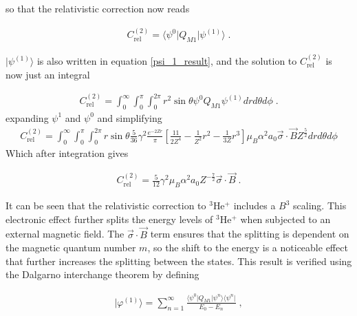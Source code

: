             \noindent so that the relativistic correction now reads 

            \begin{align}
                C_{\text{rel}}^{(2)} = \langle \psi^0 \vert Q_{M1} \vert \psi^{(1)} \rangle\;.
            \end{align}

            \noindent $\vert \psi^{(1)} \rangle$ is also written in equation \eqref{psi_1_result}, and the solution to $C_{\text{rel}}^{(2)}$ is now just an integral 

            \begin{align}
                C_{\text{rel}}^{(2)} = \int_0^\infty \int_0^\pi \int_0^{2\pi} r^2 \sin\theta \psi^0 Q_{M1} \psi^{(1)} dr d\theta d\phi\;.
            \end{align}
            \noindent expanding $\psi^1$ and $\psi^0$ and simplifying
            \small
            \begin{align}
                C_{\text{rel}}^{(2)} = \int_0^\infty \int_0^\pi \int_0^{2\pi} r \sin \theta \frac{5}{36} \gamma^2 \frac{e^{-2Zr}}{\pi} \left[ \frac{11}{2Z^4} - \frac{1}{Z^2}r^2 - \frac{1}{3Z} r^3 \right]  \mu_B \alpha^2 a_0 \vec{\sigma} \cdot \vec{B} Z^{\frac{5}{2}}  dr d\theta d\phi
            \end{align}
            \normalsize
            \noindent Which after integration gives 

            \begin{align}
                C_{\text{rel}}^{(2)} = \frac{5}{12} \gamma^2 \mu_B \alpha^2 a_0 Z^{-\frac{7}{2}} \vec{\sigma} \cdot \vec{B} \;. \label{eq:C_rel_1}
            \end{align}

            \noindent It can be seen that the relativistic correction to $^3$He$^+$ includes a $B^3$ scaling. This electronic effect further splits the energy levels of $^3$He$^+$ when subjected to an external magnetic field. The $\vec{\sigma} \cdot \vec{B}$ term ensures that the splitting is dependent on the magnetic quantum number $m$, so the shift to the energy is a noticeable effect that further increases the splitting between the states. This result is verified using the Dalgarno interchange theorem by defining

            \begin{align}
                \vert \varphi^{(1)} \rangle = \sum_{n = 1}^\infty \frac{\langle \psi^0 \vert Q_{M1} \vert \psi^n \rangle \langle \psi^n\vert}{E_0 - E_n}\;,
            \end{align}

